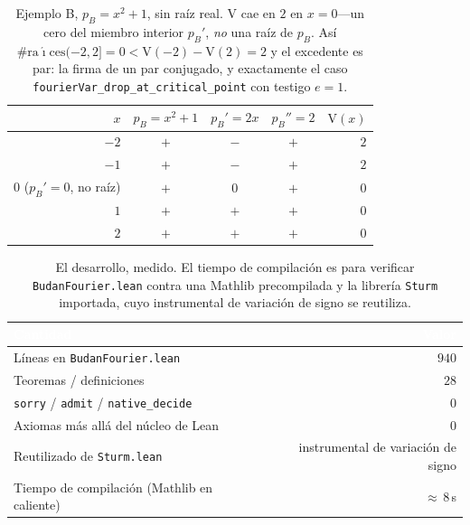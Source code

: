 \documentclass[11pt]{article}
\newcommand{\lean}[1]{\texttt{#1}}
\newcommand{\V}{\mathrm{V}}
\begin{document}
\begin{table}[H]
\centering\small
{}
\begin{tabular}{@{}rcccr@{}}
\toprule
\rowcolor{ggteal!18}
$x$ & $p_B=x^2{+}1$ & $p_B'=2x$ & $p_B''=2$ & $\V(x)$ \\
\midrule
$-2$            & $+$ & $-$ & $+$ & $2$ \\
$-1$            & $+$ & $-$ & $+$ & $2$ \\
$0$ {\scriptsize($p_B'{=}0$, no ra\'iz)} & $+$ & $0$ & $+$ & $0$ \\
$1$             & $+$ & $+$ & $+$ & $0$ \\
$2$             & $+$ & $+$ & $+$ & $0$ \\
\bottomrule
\end{tabular}
\caption{Ejemplo B, $p_B=x^2+1$, sin ra\'iz real. $\V$ cae en $2$ en $x=0$---un cero del miembro
interior $p_B'$, \emph{no} una ra\'iz de $p_B$. As\'i $\#\mathrm{ra\acute{\imath}ces}(-2,2]=0<\V(-2)-\V(2)=2$
y el excedente es par: la firma de un par conjugado, y exactamente el caso
\lean{fourierVar\_drop\_at\_critical\_point} con testigo $e=1$.}
\label{tab:signsB}
\end{table}

\begin{table}[H]
  \centering\footnotesize
  \begin{tabular}{@{}lr@{}}
    \toprule
    \rowcolor{ggteal}
    \textcolor{white}{\textbf{Cantidad}} & \textcolor{white}{\textbf{Valor}} \\
    \midrule
    \rowcolor{ggband}
    L\'ineas en \lean{BudanFourier.lean} & $940$ \\
    Teoremas / definiciones & $28$ \\
    \rowcolor{ggband}
    \lean{sorry} / \lean{admit} / \lean{native\_decide} & $0$ \\
    Axiomas m\'as all\'a del n\'ucleo de Lean & $0$ \\
    \rowcolor{ggband}
    Reutilizado de \lean{Sturm.lean} & instrumental de variaci\'on de signo \\
    Tiempo de compilaci\'on (Mathlib en caliente) & ${\approx}\,8$\,s \\
    \bottomrule
  \end{tabular}
  \caption{El desarrollo, medido. El tiempo de compilaci\'on es para verificar \lean{BudanFourier.lean}
  contra una Mathlib precompilada y la librer\'ia \lean{Sturm} importada, cuyo instrumental de
  variaci\'on de signo se reutiliza.}
  \label{tab:metrics}
\end{table}
\end{document}
